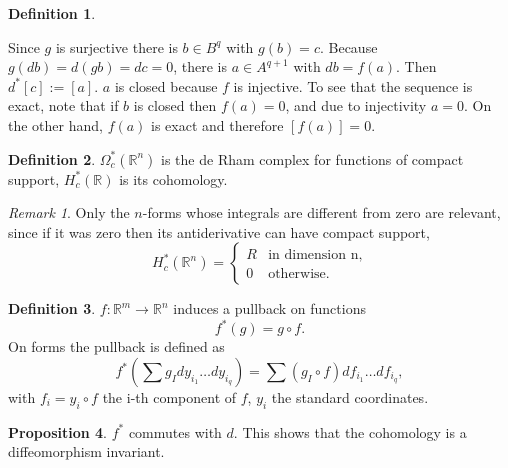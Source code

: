 \documentclass[twocolumn]{article}
\theoremstyle{definition}
\newtheorem{definition}{Definition}[section]
\newtheorem{proposition}[definition]{Proposition}
\theoremstyle{remark}
\newtheorem*{remark}{Remark}
\begin{document}
\begin{definition}
\begin{center}
    \end{center}
    Since $g$ is surjective there is $b\in B^q$ with $g(b)=c$. Because $g(db)=d(gb)=dc=0$, there is $a\in A^{q+1}$ with $db=f(a)$.
    Then $d^*[c] := [a]$. $a$ is closed because $f$ is injective. To see that the sequence is exact, note that if $b$ is closed then $f(a) = 0$, and due to injectivity $a = 0$.
    On the other hand, $f(a)$ is exact and therefore $[f(a)] = 0$.
\end{definition}
\begin{definition}
    $\Omega_c^*(\mathbb{R}^n)$ is the de Rham complex for functions of compact support,
    $H_c^*(\mathbb{R})$ is its cohomology.
\end{definition}
\begin{remark}
    Only the $n$-forms whose integrals are different from zero are relevant,
    since if it was zero then its antiderivative can have compact support,
    \begin{equation}
        H_c^*(\mathbb{R}^n) =
        \begin{cases}
            R & \textrm{in dimension n,}\\
            0 & \textrm{otherwise.}
        \end{cases}
    \end{equation}
\end{remark}
\begin{definition}
    $f: \mathbb{R}^m \rightarrow \mathbb{R}^n$ induces a pullback on functions
    \begin{equation}
        f^*(g) = g \circ f.
    \end{equation}
    On forms the pullback is defined as
    \begin{equation}
        f^*(\sum g_I dy_{i_1} \dots dy_{i_q}) = \sum(g_I \circ f) df_{i_1} \dots df_{i_q},
    \end{equation}
    with $f_i = y_i \circ f$ the i-th component of $f$, $y_i$ the standard coordinates.
\end{definition}
\begin{proposition}
    $f^*$ commutes with $d$. This shows that the cohomology is a diffeomorphism invariant.
\end{proposition}
\end{document}
